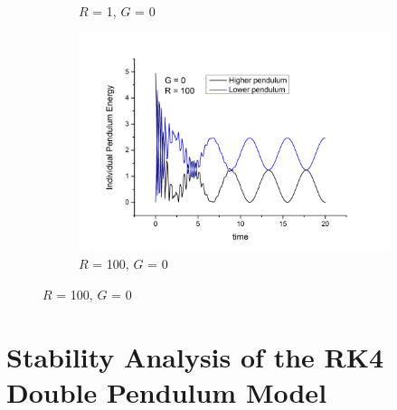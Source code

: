 \documentclass[11pt]{article}
\begin{document}
\begin{figure}[h]
\begin{subfigure}[h]{0.65\textwidth}
    \captionsetup{width=0.85\textwidth}
    \caption{$R$ = 1, $G$ = 0}
    \label{fig:dp_e_R1_G0}
  \end{subfigure}
  \newpage %
  \begin{subfigure}[h]{0.65\textwidth}
    \includegraphics[width=\textwidth]{img/individual_pens/R=100.png}
    \captionsetup{width=0.85\textwidth}
    \caption{$R$ = 100, $G$ = 0}
    \label{fig:dp_e_R100_G0}
  \end{subfigure}
  \vspace{-50pt}
\end{figure}

\section*{Stability Analysis of the RK4 Double Pendulum Model}
\end{document}
